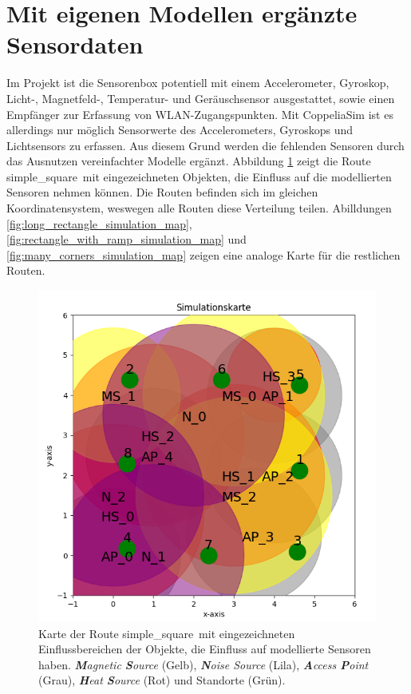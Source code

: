 \section{Mit eigenen Modellen ergänzte Sensordaten}
Im Projekt ist die Sensorenbox potentiell mit einem Accelerometer, Gyroskop, Licht-, Magnetfeld-,
Temperatur- und Geräuschsensor ausgestattet, sowie einen Empfänger zur Erfassung von WLAN-Zugangspunkten.
Mit CoppeliaSim ist es allerdings nur möglich Sensorwerte des Accelerometers, Gyroskops und Lichtsensors zu erfassen.
Aus diesem Grund werden die fehlenden Sensoren durch das Ausnutzen vereinfachter Modelle ergänzt.
\newline
\newline
Abbildung \ref{fig:simple_square_simulation_map} zeigt die Route \glqq simple\_square\grqq\ mit eingezeichneten Objekten,
die Einfluss auf die modellierten Sensoren nehmen können.
Die Routen befinden sich im gleichen Koordinatensystem, weswegen alle Routen diese Verteilung teilen.
Abilldungen \ref{fig:long_rectangle_simulation_map}, \ref{fig:rectangle_with_ramp_simulation_map} und \ref{fig:many_corners_simulation_map}
zeigen eine analoge Karte für die restlichen Routen.
\begin{figure}[h!]
    \centering
    \includegraphics[width=0.9\linewidth]{images/simple_square_simulation_map.png}
    \caption{Karte der Route \glqq simple\_square\grqq\ mit eingezeichneten Einflussbereichen der Objekte, die Einfluss auf modellierte Sensoren haben.
            \textit{\textbf{M}agnetic \textbf{S}ource} (Gelb), \textit{\textbf{N}oise Source} (Lila), \textit{\textbf{A}ccess \textbf{P}oint} (Grau),
            \textit{\textbf{H}eat \textbf{S}ource} (Rot) und Standorte (Grün).}
    \label{fig:simple_square_simulation_map}
\end{figure}

